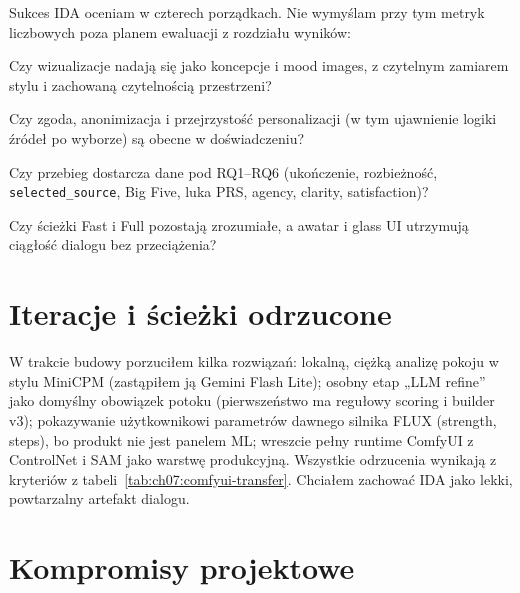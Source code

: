Sukces IDA oceniam w czterech porządkach. Nie wymyślam przy tym metryk liczbowych poza planem ewaluacji z rozdziału wyników:

\begin{description}[style=nextline]
  \item[Estetyczny]
    Czy wizualizacje nadają się jako koncepcje i mood images, z czytelnym zamiarem stylu i zachowaną czytelnością przestrzeni?
  \item[Etyczny]
    Czy zgoda, anonimizacja i przejrzystość personalizacji (w tym ujawnienie logiki źródeł po wyborze) są obecne w doświadczeniu?
  \item[Badawczy]
    Czy przebieg dostarcza dane pod RQ1--RQ6 (ukończenie, rozbieżność, \texttt{selected\_source}, Big Five, luka PRS, agency, clarity, satisfaction)?
  \item[Produktowy]
    Czy ścieżki Fast i Full pozostają zrozumiałe, a awatar i glass UI utrzymują ciągłość dialogu bez przeciążenia?
\end{description}

\section{Iteracje i ścieżki odrzucone}
\label{ch07:sec:iteracje}

W trakcie budowy porzuciłem kilka rozwiązań: lokalną, ciężką analizę pokoju w stylu MiniCPM (zastąpiłem ją Gemini Flash Lite); osobny etap „LLM refine” jako domyślny obowiązek potoku (pierwszeństwo ma regułowy scoring i builder v3); pokazywanie użytkownikowi parametrów dawnego silnika FLUX (strength, steps), bo produkt nie jest panelem ML; wreszcie pełny runtime ComfyUI z ControlNet i SAM jako warstwę produkcyjną.
Wszystkie odrzucenia wynikają z kryteriów z tabeli~\ref{tab:ch07:comfyui-transfer}. Chciałem zachować IDA jako lekki, powtarzalny artefakt dialogu.

\section{Kompromisy projektowe}
\label{ch07:sec:kompromisy}

